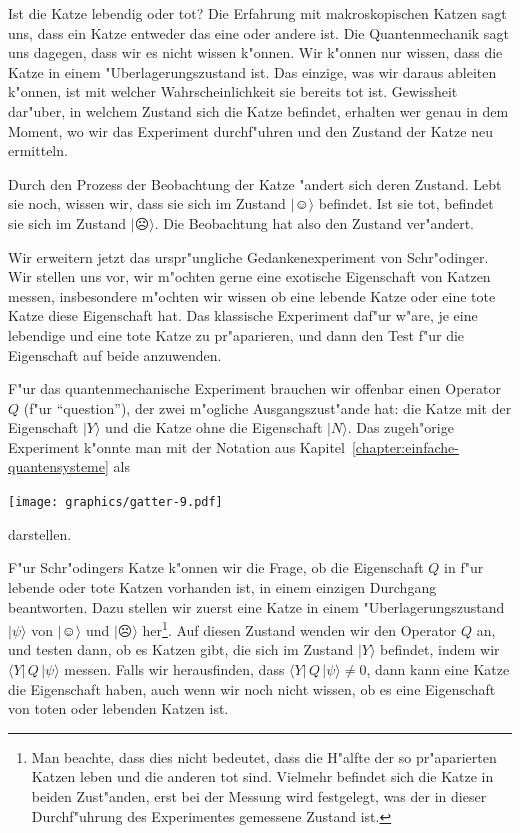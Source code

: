 Ist die Katze lebendig oder tot? Die Erfahrung mit makroskopischen
Katzen sagt uns, dass ein Katze entweder das eine oder andere ist.
Die Quantenmechanik sagt uns dagegen, dass wir es nicht wissen k"onnen.
Wir k"onnen nur wissen, dass die Katze in einem "Uberlagerungszustand
ist.
Das einzige, was wir daraus ableiten k"onnen, ist mit welcher
Wahrscheinlichkeit sie bereits tot ist.
Gewissheit dar"uber, in welchem Zustand sich die Katze befindet,
erhalten wer genau in dem Moment, wo wir das Experiment durchf"uhren
und den Zustand der Katze neu ermitteln.

Durch den Prozess der Beobachtung der Katze "andert sich deren Zustand.
Lebt sie noch, wissen wir, dass sie sich im Zustand $|\smiley\rangle$ befindet.
Ist sie tot, befindet sie sich im Zustand $|\frownie\rangle$.
Die Beobachtung hat also den Zustand ver"andert.

Wir erweitern jetzt das urspr"ungliche Gedankenexperiment von Schr"odinger.
Wir stellen uns vor, wir m"ochten gerne eine exotische Eigenschaft von
Katzen messen, insbesondere m"ochten wir wissen ob eine lebende Katze oder
eine tote Katze diese Eigenschaft hat. Das klassische Experiment
daf"ur w"are, je eine lebendige und eine tote Katze zu pr"aparieren,
und dann den Test f"ur die Eigenschaft auf beide anzuwenden.

F"ur das quantenmechanische Experiment brauchen wir offenbar einen
Operator $Q$ (f"ur ``question''), der zwei m"ogliche Ausgangszust"ande hat:
die Katze mit der
Eigenschaft $|Y\rangle$ und die Katze ohne die Eigenschaft $|N\rangle$.
Das zugeh"orige Experiment k"onnte man mit der Notation aus
Kapitel~\ref{chapter:einfache-quantensysteme} als
\begin{center}
\texttt{[image: graphics/gatter-9.pdf]}
\end{center}
darstellen. 

F"ur Schr"odingers Katze k"onnen wir die Frage, ob die Eigenschaft $Q$
in f"ur lebende oder tote Katzen vorhanden ist, in einem einzigen
Durchgang beantworten.
Dazu stellen wir zuerst eine Katze in einem "Uberlagerungszustand
$|\psi\rangle$ von $|\smiley\rangle$ und $|\frownie\rangle$ her\footnote{
Man beachte, dass dies nicht bedeutet, dass die H"alfte der so pr"aparierten
Katzen leben und die anderen tot sind.
Vielmehr befindet sich die Katze in beiden Zust"anden, erst bei der
Messung wird festgelegt, was der in dieser Durchf"uhrung des Experimentes
gemessene Zustand ist.
}.
Auf diesen Zustand wenden wir den Operator $Q$ an, und testen dann,
ob es Katzen gibt, die sich im Zustand $|Y\rangle$ befindet, indem
wir $\langle Y|\,Q\,|\psi\rangle$ messen.
Falls wir herausfinden, dass $\langle Y|\,Q\,|\psi\rangle\ne 0$,
dann kann eine Katze die Eigenschaft haben, auch wenn wir noch nicht
wissen, ob es eine Eigenschaft von toten oder lebenden Katzen ist.

